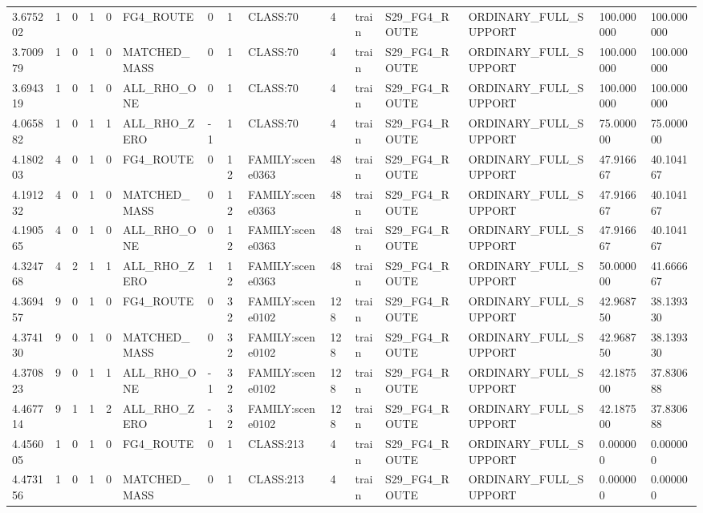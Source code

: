 \begin{tabular}{lllllllllllllll}
3.675202 & 1 & 0 & 1 & 0 & FG4\_ROUTE & 0 & 1 & CLASS:70 & 4 & train & S29\_FG4\_ROUTE & ORDINARY\_FULL\_SUPPORT & 100.000000 & 100.000000 \\
3.700979 & 1 & 0 & 1 & 0 & MATCHED\_MASS & 0 & 1 & CLASS:70 & 4 & train & S29\_FG4\_ROUTE & ORDINARY\_FULL\_SUPPORT & 100.000000 & 100.000000 \\
3.694319 & 1 & 0 & 1 & 0 & ALL\_RHO\_ONE & 0 & 1 & CLASS:70 & 4 & train & S29\_FG4\_ROUTE & ORDINARY\_FULL\_SUPPORT & 100.000000 & 100.000000 \\
4.065882 & 1 & 0 & 1 & 1 & ALL\_RHO\_ZERO & -1 & 1 & CLASS:70 & 4 & train & S29\_FG4\_ROUTE & ORDINARY\_FULL\_SUPPORT & 75.000000 & 75.000000 \\
4.180203 & 4 & 0 & 1 & 0 & FG4\_ROUTE & 0 & 12 & FAMILY:scene0363 & 48 & train & S29\_FG4\_ROUTE & ORDINARY\_FULL\_SUPPORT & 47.916667 & 40.104167 \\
4.191232 & 4 & 0 & 1 & 0 & MATCHED\_MASS & 0 & 12 & FAMILY:scene0363 & 48 & train & S29\_FG4\_ROUTE & ORDINARY\_FULL\_SUPPORT & 47.916667 & 40.104167 \\
4.190565 & 4 & 0 & 1 & 0 & ALL\_RHO\_ONE & 0 & 12 & FAMILY:scene0363 & 48 & train & S29\_FG4\_ROUTE & ORDINARY\_FULL\_SUPPORT & 47.916667 & 40.104167 \\
4.324768 & 4 & 2 & 1 & 1 & ALL\_RHO\_ZERO & 1 & 12 & FAMILY:scene0363 & 48 & train & S29\_FG4\_ROUTE & ORDINARY\_FULL\_SUPPORT & 50.000000 & 41.666667 \\
4.369457 & 9 & 0 & 1 & 0 & FG4\_ROUTE & 0 & 32 & FAMILY:scene0102 & 128 & train & S29\_FG4\_ROUTE & ORDINARY\_FULL\_SUPPORT & 42.968750 & 38.139330 \\
4.374130 & 9 & 0 & 1 & 0 & MATCHED\_MASS & 0 & 32 & FAMILY:scene0102 & 128 & train & S29\_FG4\_ROUTE & ORDINARY\_FULL\_SUPPORT & 42.968750 & 38.139330 \\
4.370823 & 9 & 0 & 1 & 1 & ALL\_RHO\_ONE & -1 & 32 & FAMILY:scene0102 & 128 & train & S29\_FG4\_ROUTE & ORDINARY\_FULL\_SUPPORT & 42.187500 & 37.830688 \\
4.467714 & 9 & 1 & 1 & 2 & ALL\_RHO\_ZERO & -1 & 32 & FAMILY:scene0102 & 128 & train & S29\_FG4\_ROUTE & ORDINARY\_FULL\_SUPPORT & 42.187500 & 37.830688 \\
4.456005 & 1 & 0 & 1 & 0 & FG4\_ROUTE & 0 & 1 & CLASS:213 & 4 & train & S29\_FG4\_ROUTE & ORDINARY\_FULL\_SUPPORT & 0.000000 & 0.000000 \\
4.473156 & 1 & 0 & 1 & 0 & MATCHED\_MASS & 0 & 1 & CLASS:213 & 4 & train & S29\_FG4\_ROUTE & ORDINARY\_FULL\_SUPPORT & 0.000000 & 0.000000 \\

\end{tabular}
